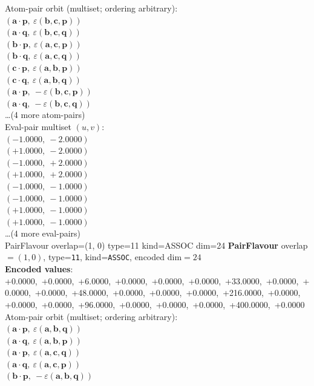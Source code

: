\documentclass[a4paper,11pt]{article}
\newcommand{\pdcegfomjfhook}[2]{\mathbf{#1} \cdot \mathbf{#2}}
\newcommand{\kblbmcpggoncpf}[3]{\varepsilon(\mathbf{#1},\mathbf{#2},\mathbf{#3})}
\begin{document}
\quad Atom-pair orbit (multiset; ordering arbitrary):\\
$(\pdcegfomjfhook{a}{p},\ \kblbmcpggoncpf{b}{c}{p})$\\
$(\pdcegfomjfhook{a}{q},\ \kblbmcpggoncpf{b}{c}{q})$\\
$(\pdcegfomjfhook{b}{p},\ \kblbmcpggoncpf{a}{c}{p})$\\
$(\pdcegfomjfhook{b}{q},\ \kblbmcpggoncpf{a}{c}{q})$\\
$(\pdcegfomjfhook{c}{p},\ \kblbmcpggoncpf{a}{b}{p})$\\
$(\pdcegfomjfhook{c}{q},\ \kblbmcpggoncpf{a}{b}{q})$\\
$(\pdcegfomjfhook{a}{p},\ -\kblbmcpggoncpf{b}{c}{p})$\\
$(\pdcegfomjfhook{a}{q},\ -\kblbmcpggoncpf{b}{c}{q})$\\
\quad \ldots (4 more atom-pairs)\\
\quad Eval-pair multiset $(u, v)$:\\
$(-1.0000,\ -2.0000)$\\
$(+1.0000,\ -2.0000)$\\
$(-1.0000,\ +2.0000)$\\
$(+1.0000,\ +2.0000)$\\
$(-1.0000,\ -1.0000)$\\
$(-1.0000,\ -1.0000)$\\
$(+1.0000,\ -1.0000)$\\
$(+1.0000,\ -1.0000)$\\
\quad \ldots (4 more eval-pairs)\\
    PairFlavour  overlap=(1, 0)  type=11  kind=ASSOC  dim=24
\textbf{PairFlavour} overlap$=(1, 0)$, type=\texttt{11}, kind=\texttt{ASSOC}, encoded dim$=24$\\
\textbf{      Encoded values}: +0.0000,\ +0.0000,\ +6.0000,\ +0.0000,\ +0.0000,\ +0.0000,\ +33.0000,\ +0.0000,\ +0.0000,\ +0.0000,\ +48.0000,\ +0.0000,\ +0.0000,\ +0.0000,\ +216.0000,\ +0.0000,\ +0.0000,\ +0.0000,\ +96.0000,\ +0.0000,\ +0.0000,\ +0.0000,\ +400.0000,\ +0.0000\\
\quad Atom-pair orbit (multiset; ordering arbitrary):\\
$(\pdcegfomjfhook{a}{p},\ \kblbmcpggoncpf{a}{b}{q})$\\
$(\pdcegfomjfhook{a}{q},\ \kblbmcpggoncpf{a}{b}{p})$\\
$(\pdcegfomjfhook{a}{p},\ \kblbmcpggoncpf{a}{c}{q})$\\
$(\pdcegfomjfhook{a}{q},\ \kblbmcpggoncpf{a}{c}{p})$\\
$(\pdcegfomjfhook{b}{p},\ -\kblbmcpggoncpf{a}{b}{q})$\\
\end{document}

